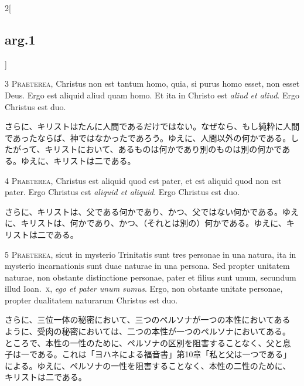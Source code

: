 \documentclass[paper=a4paper,fontsize=10pt,jafontsize=9pt,titlepage]{jlreq}
\begin{document}
\begin{paracol}{2}[\subsection{arg.1}]

{\scshape 3 Praeterea}, Christus non est tantum homo,
 quia, si purus homo esset, non esset Deus. Ergo est aliquid aliud quam
 homo. Et ita in Christo est {\itshape aliud et aliud}. Ergo Christus est duo.

\switchcolumn

さらに、キリストはたんに人間であるだけではない。なぜなら、もし純粋に人間であったならば、神ではなかったであろう。ゆえに、人間以外の何かである。したがって、キリストにおいて、あるものは何かであり別のものは別の何かである。ゆえに、キリストは二である。


{\scshape 4 Praeterea}, Christus est aliquid quod est
 pater, et est aliquid quod non est pater. Ergo Christus est {\itshape aliquid et
 aliquid}. Ergo Christus est duo.

\switchcolumn

さらに、キリストは、父である何かであり、かつ、父ではない何かである。ゆえに、キリストは、何かであり、かつ、（それとは別の）何かである。ゆえに、キリストは二である。


{\scshape 5 Praeterea}, sicut in mysterio Trinitatis
 sunt tres personae in una natura, ita in mysterio incarnationis sunt
 duae naturae in una persona. Sed propter unitatem naturae, non obstante
 distinctione personae, pater et filius sunt unum, secundum illud
 Ioan.~{\scshape x}, {\itshape ego et pater unum sumus}. Ergo, non obstante unitate personae,
 propter dualitatem naturarum Christus est duo.

\switchcolumn

さらに、三位一体の秘密において、三つのペルソナが一つの本性においてある
ように、受肉の秘密においては、二つの本性が一つのペルソナにおいてある。
ところで、本性の一性のために、ペルソナの区別を阻害することなく、父と息
子は一である。これは「ヨハネによる福音書」第10章「私と父は一つである」
による。ゆえに、ペルソナの一性を阻害することなく、本性の二性のために、
キリストは二である。


\end{paracol}
\end{document}
